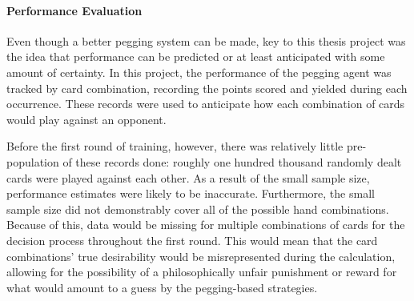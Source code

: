 \paragraph{Performance Evaluation}

Even though a better pegging system can be made,
key to this thesis project was the idea that performance can be predicted
or at least anticipated with some amount of certainty.
%
In this project,
the performance of the pegging agent was tracked by card combination,
recording the points scored and yielded during each occurrence.
%
These records were used to anticipate how each combination of cards would
play against an opponent.

Before the first round of training,
however,
there was relatively little pre-population of these records done:
roughly one hundred thousand randomly dealt cards were played against each
other.
%
As a result of the small sample size,
performance estimates were likely to be inaccurate.
%
Furthermore,
the small sample size did not demonstrably cover all of the possible hand
combinations.
%
Because of this,
data would be missing for multiple combinations of cards
for the decision process
throughout the first round.
%
This would mean that the card combinations' true desirability would be
misrepresented during the calculation,
allowing for the possibility of a philosophically unfair
punishment or reward for what would amount to a guess by the
pegging-based strategies.


